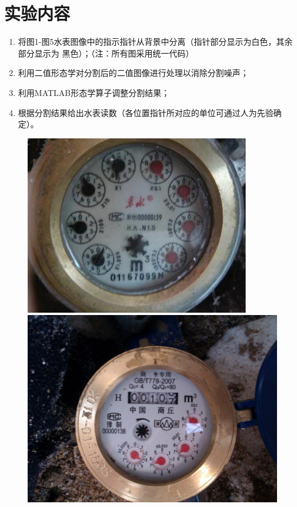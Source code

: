 \documentclass[a4paper]{ctexart}
\begin{document}
\section{实验内容}
\begin{enumerate}[label=\arabic*、]
	\item 将图1-图5水表图像中的指示指针从背景中分离（指针部分显示为白色，其余部分显示为 黑色）；（注：所有图采用统一代码）
	\item 利用二值形态学对分割后的二值图像进行处理以消除分割噪声；
	\item 利用MATLAB形态学算子调整分割结果；
	\item 根据分割结果给出水表读数（各位置指针所对应的单位可通过人为先验确定）。
\end{enumerate}
\begin{figure}[htbp]
	\centering
	\begin{minipage}[t]{0.25\textwidth}
		\centering
		\includegraphics[width=\textwidth]{figure/img1.jpg}
		\caption{}\label{fig:1}
	\end{minipage}
	\begin{minipage}[t]{0.25\textwidth}
		\centering
		\includegraphics[width=\textwidth]{figure/img2.jpg}

\end{minipage}
\end{figure}
\end{document}
